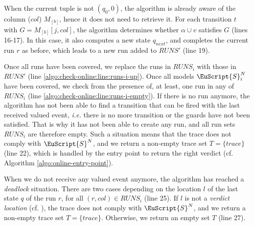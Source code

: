When the current tuple is not $(q_0, 0)$, the algorithm is
already aware of the column ($col$) $M_{[b]}$, hence it does not
need to retrieve it. For each transition $t$ with $G = M_{[b]}[j,
col]$, the algorithm determines whether $\alpha \cup v$ satisfies
$G$ (lines 16-17). %
In this case, it also computes a new state $q_{next}$, and
completes the current run $r$ as before, which leads to a new
run added to $RUNS'$ (line 19). %

Once all runs have been covered, we replace the runs in  $RUNS_i$
with those in $RUNS'$ (line
\ref{algo:check-online:line:runs-i-up}). Once all models
$\EuScript{S}_i^N$ have been covered, we check from the presence
of, at least, one run in any of $RUNS_i$ (line
\ref{algo:check-online:line:runs-i-empty}). If there is no run
anymore, the algorithm has not been able to find a transition
that can be fired with the last received valued event,
\emph{i.e.} there is no more transition or the guards have not
been satisfied. That is why it has not been able to create any
run, and all run sets $RUNS_i$ are therefore empty. Such a
situation means that the trace does not comply with
$\EuScript{S}^N$, and we return a non-empty trace set $T = \{
trace \}$ (line 22), which is handled by the entry point to
return the right verdict (cf. Algorithm
\ref{algo:online-entry-point}). %

When we do not receive any valued event anymore, the algorithm
has reached a \emph{deadlock} situation. There are two cases
depending on the location $l$ of the last state $q$ of the run
$r$, for all $(r, col) \in RUNS_i$ (line 25). %
If $l$ is not a \emph{verdict location} (cf.
), the trace does not
comply with  $\EuScript{S}^N$, and we return a non-empty trace
set $T = \{ trace \}$.  Otherwise, we return an empty set $T$
(line 27). %

